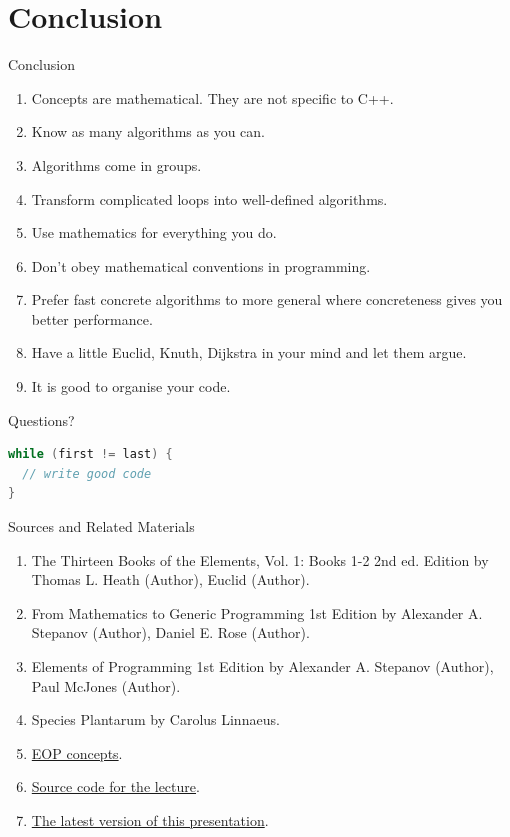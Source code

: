 \documentclass[10pt]{beamer}
\begin{document}
\section{Conclusion}
\begin{frame}{Conclusion}
  \begin{enumerate}
    \item Concepts are mathematical. They are not specific to C++.
    \item Know as many algorithms as you can.
    \item Algorithms come in groups.
    \item Transform complicated loops into well-defined algorithms.
    \item Use mathematics for everything you do.
    \item Don't obey mathematical conventions in programming.
    \item Prefer fast concrete algorithms to more general where concreteness gives you better performance.
    \item Have a little Euclid, Knuth, Dijkstra in your mind and let them argue.
    \item It is good to organise your code.
  \end{enumerate}
\end{frame}

\begin{frame}[fragile]{Questions?}
\begin{lstlisting}[language=C++,basicstyle=\huge]
while (first != last) {
  // write good code
}
\end{lstlisting}
\end{frame}

\begin{frame}{Sources and Related Materials}
  \begin{enumerate}
    \item The Thirteen Books of the Elements, Vol. 1: Books 1-2 2nd ed. Edition by Thomas L. Heath (Author), Euclid (Author).
    \item From Mathematics to Generic Programming 1st Edition by Alexander A. Stepanov (Author), Daniel E. Rose (Author).
    \item Elements of Programming 1st Edition by Alexander A. Stepanov (Author), Paul McJones (Author).
    \item Species Plantarum by Carolus Linnaeus.
    \item \href{http://elementsofprogramming.com/eop-concepts.pdf}{EOP concepts}.
    \item \href{https://github.com/tshev/tshev.github.io/tree/master/files/presentations/CppCon/2019/6-algorithmic-journeys-with-concepts/code}{Source code for the lecture}.
    \item \href{https://github.com/tshev/tshev.github.io/blob/master/files/presentations/CppCon/2019/6-algorithmic-journeys-with-concepts/6 Algorithmic Journeys with Concepts - Taras Shevchenko - CppCon 2019.pdf}{The latest version of this presentation}.
  \end{enumerate}
\end{frame}
\end{document}

